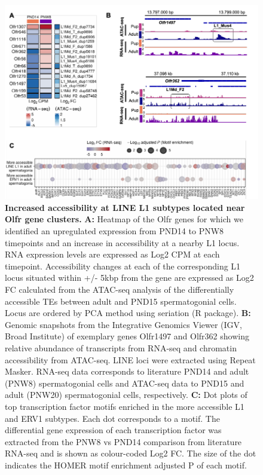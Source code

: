 \documentclass[12pt,twoside]{reedthesis}
\begin{document}
\begin{figure}[H]

{\centering \includegraphics{thesis_files/figure-latex/df6-1} 

}

\caption[Increased accessibility at LINE L1 subtypes located near Olfr gene clusters]{\textbf{Increased accessibility at LINE L1 subtypes located near Olfr gene clusters.} \newline \textbf{A:} Heatmap of the Olfr genes for which we identified an upregulated expression from PND14 to PNW8 timepoints and an increase in accessibility at a nearby L1 locus. RNA expression levels are expressed as Log2 CPM at each timepoint. Accessibility changes at each of the corresponding L1 locus situated within +/- 5kbp from the gene are expressed as Log2 FC calculated from the ATAC-seq analysis of the differentially accessible TEs between adult and PND15 spermatogonial cells. Locus are ordered by PCA method using seriation (R package). \newline \textbf{B:} Genomic snapshots from the Integrative Genomics Viewer (IGV, Broad Institute) of exemplary genes Olfr1497 and Olfr362 showing relative abundance of transcripts from RNA-seq and chromatin accessibility from ATAC-seq. LINE loci were extracted using Repeat Masker. RNA-seq data corresponds to literature PND14 and adult (PNW8) spermatogonial cells and ATAC-seq data to PND15 and adult (PNW20) spermatogonial cells, respectively. \newline \textbf{C:} Dot plots of top transcription factor motifs enriched in the more accessible L1 and ERV1 subtypes. Each dot corresponds to a motif. The differential gene expression of each transcription factor was extracted from the PNW8 vs PND14 comparison from literature RNA-seq and is shown as colour-coded Log2 FC. The size of the dot indicates the HOMER motif enrichment adjusted P of each motif.}\label{fig:df6}
\end{figure}
\end{document}
